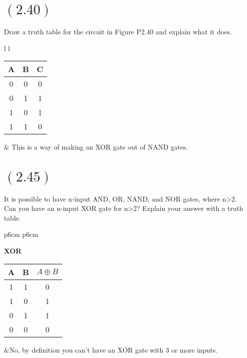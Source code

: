 \documentclass[letterpaper,12pt,titlepage]{article}
\begin{document}
\section*{$(2.40)$} Draw a truth table for the circuit in Figure P2.40 and explain what it does.\\
\begin{tabular}{l l}
 \begin{tabular}{c | c | c}
A & B & C \\ \hline
0 & 0 & 0 \\
0 & 1 & 1 \\
1 & 0 & 1 \\
1 & 1 & 0 \\
\end{tabular}
& This is a way of making an XOR gate out of NAND gates. 
\end{tabular}

\section*{$(2.45)$} It is possible to have n-input AND, OR, NAND, and NOR gates, where n\textgreater 2. Can you have an n-input XOR gate for n\textgreater 2? Explain your answer with a truth table.

\begin{center}
\begin{tabular}{p{6cm} p{6cm}}

\textbf{XOR}
 \begin{tabular}{c |  c | c}
A 	& B 	& $A \oplus B $\\ \hline
1 	& 1 	&   0		\\
1 	& 0 	&   1		\\
0 	& 1 	&   1		\\
0 	& 0 	&   0		\\
\end{tabular}
&No, by definition you can't have an XOR gate with 3 or more inputs. 
\end{tabular}

\end{center}




\end{document}
